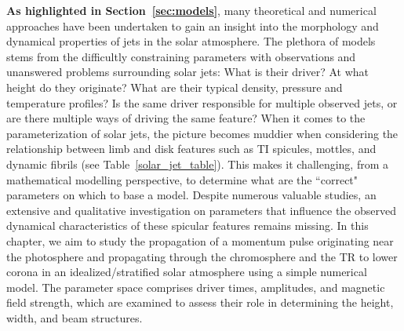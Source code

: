 {\bf As highlighted in Section~\ref{sec:models}}, many theoretical and numerical approaches have been undertaken to gain an insight into the morphology and dynamical properties of jets in the solar atmosphere. The plethora of models stems from the difficultly constraining parameters with observations and unanswered problems surrounding solar jets: What is their driver? At what height do they originate? What are their typical density, pressure and temperature profiles? Is the same driver responsible for multiple observed jets, or are there multiple ways of driving the same feature? When it comes to the parameterization of solar jets, the picture becomes muddier when considering the relationship between limb and disk features such as TI spicules, mottles, and dynamic fibrils (see Table~\ref{solar_jet_table}). This makes it challenging, from a mathematical modelling perspective, to determine what are the ``correct" parameters on which to base a model. Despite numerous valuable studies, an extensive and qualitative investigation on parameters that influence the observed dynamical characteristics of these spicular features remains missing. In this chapter, we aim to study the propagation of a momentum pulse originating near the photosphere and propagating through the chromosphere and the TR to lower corona in an idealized/stratified solar atmosphere using a simple numerical model. The parameter space comprises driver times, amplitudes, and magnetic field strength, which are examined to assess their role in determining the height, width, and beam structures.
